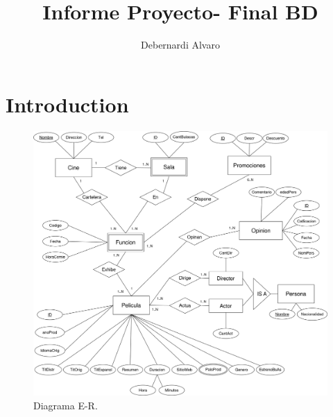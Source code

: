 \documentclass{article}
\title{Informe Proyecto- Final BD}
\author{Debernardi Alvaro}
\begin{document}
\maketitle

\section{Introduction}

  \begin{figure}[h]
    \centering
    \includegraphics[scale=0.2]{Diagramm.png}
    \caption{Diagrama E-R.}
  \end{figure}
\end{document}
